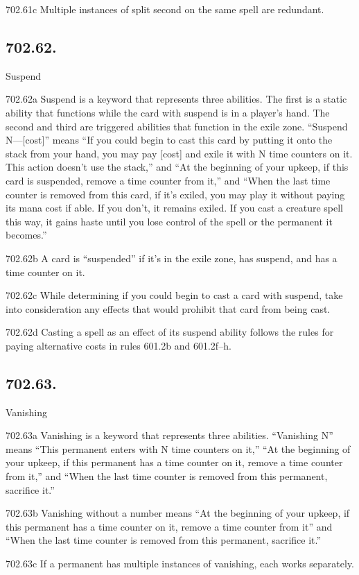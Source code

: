 702.61c Multiple instances of split second on the same spell are redundant.

\subsection*{702.62.}
Suspend

702.62a Suspend is a keyword that represents three abilities. The first is a static ability that functions while the card with suspend is in a player’s hand. The second and third are triggered abilities that function in the exile zone. “Suspend N—[cost]” means “If you could begin to cast this card by putting it onto the stack from your hand, you may pay [cost] and exile it with N time counters on it. This action doesn’t use the stack,” and “At the beginning of your upkeep, if this card is suspended, remove a time counter from it,” and “When the last time counter is removed from this card, if it’s exiled, you may play it without paying its mana cost if able. If you don’t, it remains exiled. If you cast a creature spell this way, it gains haste until you lose control of the spell or the permanent it becomes.”

702.62b A card is “suspended” if it’s in the exile zone, has suspend, and has a time counter on it.

702.62c While determining if you could begin to cast a card with suspend, take into consideration any effects that would prohibit that card from being cast.

702.62d Casting a spell as an effect of its suspend ability follows the rules for paying alternative costs in rules 601.2b and 601.2f–h.

\subsection*{702.63.}
Vanishing

702.63a Vanishing is a keyword that represents three abilities. “Vanishing N” means “This permanent enters with N time counters on it,” “At the beginning of your upkeep, if this permanent has a time counter on it, remove a time counter from it,” and “When the last time counter is removed from this permanent, sacrifice it.”

702.63b Vanishing without a number means “At the beginning of your upkeep, if this permanent has a time counter on it, remove a time counter from it” and “When the last time counter is removed from this permanent, sacrifice it.”

702.63c If a permanent has multiple instances of vanishing, each works separately.

